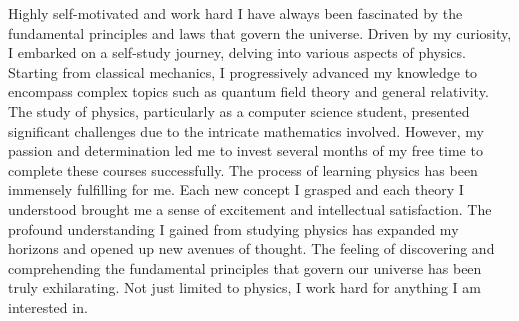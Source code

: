 
\begin{cventries}

	\cventry
	{} %
	{Highly self-motivated and work hard} %
	{\hfill} %
	{} %
	{
		\quad I have always been fascinated by the fundamental principles and laws that govern the universe. Driven by my curiosity, I embarked on a self-study journey, delving into various aspects of physics. Starting from classical mechanics, I progressively advanced my knowledge to encompass complex topics such as quantum field theory and general relativity. The study of physics, particularly as a computer science student, presented significant challenges due to the intricate mathematics involved. However, my passion and determination led me to invest several months of my free time to complete these courses successfully. \newline
		\quad The process of learning physics has been immensely fulfilling for me. Each new concept I grasped and each theory I understood brought me a sense of excitement and intellectual satisfaction. The profound understanding I gained from studying physics has expanded my horizons and opened up new avenues of thought. The feeling of discovering and comprehending the fundamental principles that govern our universe has been truly exhilarating. Not just limited to physics, I work hard for anything I am interested in.
	}
\end{cventries}
